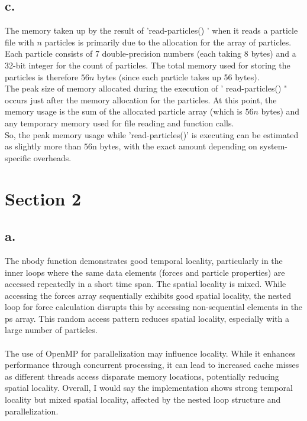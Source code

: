 \documentclass{article}
\begin{document}
\subsection*{c.}
The memory taken up by the result of 'read-particles() ' when it reads a particle file with $n$ particles is primarily due to the allocation for the array of particles. Each particle consists of 7 double-precision numbers (each taking 8 bytes) and a 32-bit integer for the count of particles. The total memory used for storing the particles is therefore $56 n$ bytes (since each particle takes up 56 bytes).
\\
The peak size of memory allocated during the execution of ' read-particles() " occurs just after the memory allocation for the particles. At this point, the memory usage is the sum of the allocated particle array (which is $56 n$ bytes) and any temporary memory used for file reading and function calls.
\\
So, the peak memory usage while 'read-particles()' is executing can be estimated as slightly more than $56 \mathrm{n}$ bytes, with the exact amount depending on system-specific overheads.

\section*{Section 2}

\subsection*{a.}
The nbody function demonstrates good temporal locality, particularly in the inner loops where the same data elements (forces and particle properties) are accessed repeatedly in a short time span. The spatial locality is mixed. While accessing the forces array sequentially exhibits good spatial locality, the nested loop for force calculation disrupts this by accessing non-sequential elements in the ps array. This random access pattern reduces spatial locality, especially with a large number of particles.
\\
\\
The use of OpenMP for parallelization may influence locality. While it enhances performance through concurrent processing, it can lead to increased cache misses as different threads access disparate memory locations, potentially reducing spatial locality.
Overall, I would say the implementation shows strong temporal locality but mixed spatial locality, affected by the nested loop structure and parallelization.
\end{document}
